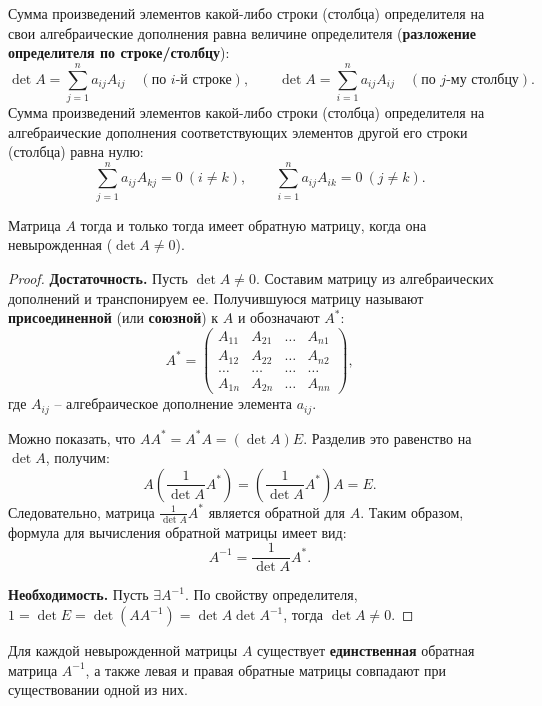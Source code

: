 \documentclass[10pt]{article}
\begin{document}
\begin{theorem}
Сумма произведений элементов какой-либо строки (столбца) определителя на свои алгебраические дополнения равна величине определителя (\textbf{разложение определителя по строке/столбцу}):
\[
\det A = \sum_{j=1}^{n} a_{ij} A_{ij} \quad (\text{по } i\text{-й строке}), \qquad
\det A = \sum_{i=1}^{n} a_{ij} A_{ij} \quad (\text{по } j\text{-му столбцу}).
\]
Сумма произведений элементов какой-либо строки (столбца) определителя на алгебраические дополнения соответствующих элементов другой его строки (столбца) равна нулю:
\[
\sum_{j=1}^{n} a_{ij} A_{kj} = 0 \ (i \neq k), \qquad
\sum_{i=1}^{n} a_{ij} A_{ik} = 0 \ (j \neq k).
\]
\end{theorem}

\begin{theorem}
Матрица \(A\) тогда и только тогда имеет обратную матрицу, когда она невырожденная (\(\det A \neq 0\)).
\end{theorem}

\begin{proof}
\textbf{Достаточность.} Пусть \(\det A \neq 0\). Составим матрицу из алгебраических дополнений и транспонируем ее. Получившуюся матрицу называют \textbf{присоединенной} (или \textbf{союзной}) к \(A\) и обозначают \(A^{*}\):
\[
A^{*} = \begin{pmatrix}
A_{11} & A_{21} & \dots & A_{n1} \\
A_{12} & A_{22} & \dots & A_{n2} \\
\dots & \dots & \dots & \dots \\
A_{1n} & A_{2n} & \dots & A_{nn}
\end{pmatrix},
\]
где \(A_{ij}\) – алгебраическое дополнение элемента \(a_{ij}\).

Можно показать, что \(A A^{*} = A^{*} A = (\det A) E\). Разделив это равенство на \(\det A\), получим:
\[
A \left( \frac{1}{\det A} A^{*} \right) = \left( \frac{1}{\det A} A^{*} \right) A = E.
\]
Следовательно, матрица \(\frac{1}{\det A} A^{*}\) является обратной для \(A\). Таким образом, формула для вычисления обратной матрицы имеет вид:
\begin{equation} \label{eq:inverse_formula}
A^{-1} = \frac{1}{\det A} A^{*}.
\end{equation}

\textbf{Необходимость.} Пусть $\exists A^{-1}$. По свойству определителя, $1 = \det E = \det (AA^{-1}) = \det A \det A^{-1}$, тогда $\det A \neq 0$.
\end{proof}

\begin{remark}
Для каждой невырожденной матрицы \(A\) существует \textbf{единственная} обратная матрица \(A^{-1}\), а также левая и правая обратные матрицы совпадают при существовании одной из них.
\end{remark}
\end{document}
